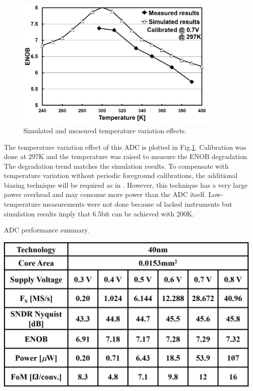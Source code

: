 \begin{figure}
\centering
  \includegraphics[width=0.9\textwidth]{figure/chap4/fig17.jpg}
  \caption{Simulated and measured temperature variation effects.}
  \label{fig-4-17}
\end{figure}

The temperature variation effect of this ADC is plotted in Fig.\ref{fig-4-17}. Calibration was done at 297K and the temperature was raised to measure the ENOB degradation. The degradation trend matches the simulation results. To compensate with temperature variation without periodic foreground calibrations, the additional biasing technique will be required as in \cite{nakajima-cal}. However, this technique has a very large power overhead and may consume more power than the ADC itself. Low-temperature measurements were not done because of lacked instruments but simulation results imply that 6.5bit can be achieved with 200K.

\begin{table}
    \centering
    \caption{ADC performance summary.}
    \includegraphics[width=1\textwidth]{figure/chap4/fig18.jpg}
    
    \label{tab:4-2}
\end{table}

